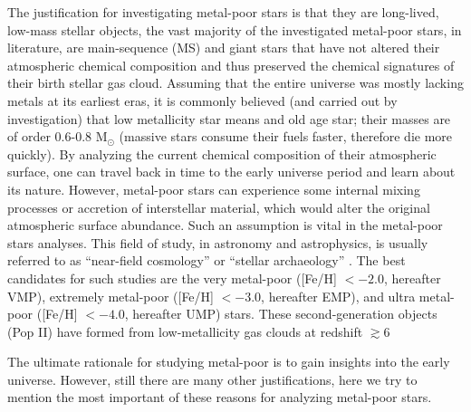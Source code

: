 The justification for investigating metal-poor stars is that they are long-lived, low-mass stellar objects, the vast majority of the investigated metal-poor stars, in literature,  are main-sequence (MS) and giant stars that have not altered their atmospheric chemical composition and thus preserved the chemical signatures of their birth stellar gas cloud. Assuming that the entire universe was mostly lacking metals at its earliest eras, it is commonly believed (and carried out by investigation) that low metallicity star means and old age star; their masses are of order  0.6-0.8 M$_{\odot}$ (massive stars consume their fuels faster, therefore die more quickly). By analyzing the current chemical composition of their atmospheric surface, one can travel back in time to the early universe period and learn about its nature.  However, metal-poor stars can experience some internal mixing processes or accretion of interstellar material, which would alter the original atmospheric surface abundance. Such an assumption is vital in the metal-poor stars analyses. This field of study, in astronomy and astrophysics, is usually referred to as “near-field cosmology” or “stellar archaeology” \citep{2002Natur.419..904C, 2003Natur.422..871U, 2005Natur.434..871F, 2007ApJ...660..516T, 2010ApJ...724..341H, 2011Natur.477...67C, 2013ApJ...773...33I, 2013ARA&A..51..457N,
2014ApJ...790...34P,2014Natur.506..463K, 2014ApJ...785...98T, 2016A&A...586A.160H,  2018MNRAS.481.3838S, 2019arXiv190403211E}. The best candidates for such studies are the very metal-poor ([Fe/H] $< -2.0$, hereafter VMP), extremely metal-poor ([Fe/H] $< -3.0$, hereafter EMP), and  ultra metal-poor ([Fe/H] $< -4.0$, hereafter UMP) stars. These second-generation objects (Pop II) have formed from low-metallicity gas clouds at redshift $\gtrsim 6$


The ultimate rationale for studying metal-poor is to gain insights into the early universe. However, still there are many other justifications, here we try to mention the most important of these reasons for analyzing metal-poor stars. 


